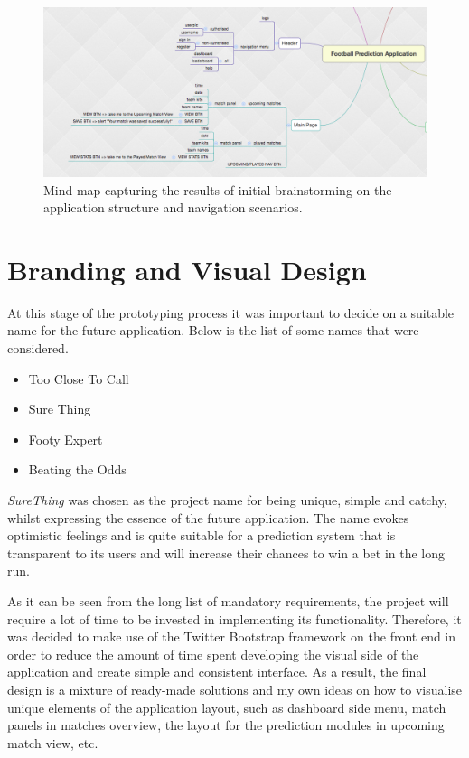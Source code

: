 \begin{figure}[H]
	\begin{center}
		\includegraphics[width=.90\textwidth]{design/images/mindmap}
		\caption{Mind map capturing the results of initial brainstorming on the application structure and navigation scenarios.}
		\label{fig:using:mindmap}
	\end{center}
\end{figure}

\section{Branding and Visual Design}
\label{sec:visdesign_design}
At this stage of the prototyping process it was important to decide on a suitable name for the future application. Below is the list of some names that were considered.

\begin{itemize}
	\item Too Close To Call
	\item Sure Thing
	\item Footy Expert
	\item Beating the Odds
\end{itemize}

\emph{SureThing} was chosen as the project name for being unique, simple and catchy, whilst expressing the essence of the future application. The name evokes optimistic feelings and is quite suitable for a prediction system that is transparent to its users and will increase their chances to win a bet in the long run. 

As it can be seen from the long list of mandatory requirements, the project will require a lot of time to be invested in implementing its functionality. Therefore, it was decided to make use of the Twitter Bootstrap framework on the front end \citep{documentation:Bootstrap3} \citep{web:templateProgressus} in order to reduce the amount of time spent developing the visual side of the application and create simple and consistent interface. As a result, the final design is a mixture of ready-made solutions and my own ideas on how to visualise unique elements of the application layout, such as dashboard side menu, match panels in matches overview, the layout for the prediction modules in upcoming match view, etc. 


